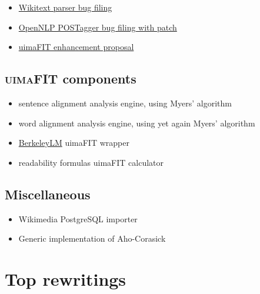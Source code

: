 \documentclass[a4paper, 11pt, onepage]{scrreprt}
\begin{document}
\begin{itemize}
\item
  \href{https://bugs.eclipse.org/bugs/show_bug.cgi?id=433163}{Wikitext
    parser bug filing}
\item \href{https://issues.apache.org/jira/browse/OPENNLP-676}{OpenNLP
    POSTagger bug filing with patch}
\item \href{https://issues.apache.org/jira/browse/UIMA-3913}{uimaFIT
    enhancement proposal}
\end{itemize}

\section{\textsc{uimaFIT} components}
\label{sec:uimafit-components}

\begin{itemize}
\item sentence alignment analysis engine, using Myers' algorithm
\item word alignment analysis engine, using yet again Myers' algorithm
\item \href{https://berkeleylm.googlecode.com/}{BerkeleyLM} uimaFIT
  wrapper
\item readability formulas uimaFIT calculator
\end{itemize}

\section{Miscellaneous}
\label{sec:misc-software}
\begin{itemize}
\item Wikimedia PostgreSQL importer
\item Generic implementation of Aho-Corasick
\end{itemize}

\chapter{Top rewritings}
\end{document}
